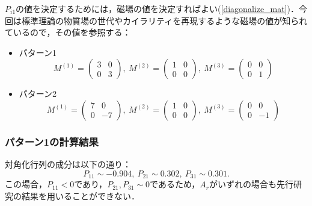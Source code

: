 \documentclass[a4paper,uplatex,dvipdfmx]{jsarticle}
\theoremstyle{definition}
\begin{document}
$P_{i1}$の値を決定するためには，磁場の値を決定すればよい(\ref{diagonalize_mat})．今回は標準理論の物質場の世代やカイラリティを再現するような磁場の値が知られているので，その値を参照する：
\begin{itemize}
   \item 
   パターン1\cite{Abe_SuperfieldDescription_2012}
   \begin{equation}
      M^{(1)}
      =
      \begin{pmatrix}
        3 & 0 \\
        0 & 3
      \end{pmatrix}
      ,\ 
      M^{(2)}
      =
      \begin{pmatrix}
        1 & 0 \\
        0 & 0
      \end{pmatrix}
      ,\ 
      M^{(3)}
      =
      \begin{pmatrix}
        0 & 0 \\
        0 & 1
      \end{pmatrix}
      \nonumber
   \end{equation}
   \item 
   パターン2\cite{Abe_AhlerModuli_2017}
   \begin{equation}
      M^{(1)}
      =
      \begin{pmatrix}
        7 & 0 \\
        0 & -7
      \end{pmatrix}
      ,\ 
      M^{(2)}
      =
      \begin{pmatrix}
        1 & 0 \\
        0 & 0
      \end{pmatrix}
      ,\ 
      M^{(3)}
      =
      \begin{pmatrix}
        0 & 0 \\
        0 & -1
      \end{pmatrix}
      \nonumber
   \end{equation}
\end{itemize}

\subsubsection*{パターン1の計算結果}

対角化行列の成分は以下の通り：
\begin{equation}
   P_{11}\sim -0.904
   ,\ 
   P_{21}\sim 0.302
   ,\ 
   P_{31}\sim 0.301
   .
   \nonumber
\end{equation}
この場合，$P_{11}<0$であり，$P_{21},P_{31}\sim 0$であるため，$A_{r}$がいずれの場合も先行研究の結果を用いることができない．
\end{document}
